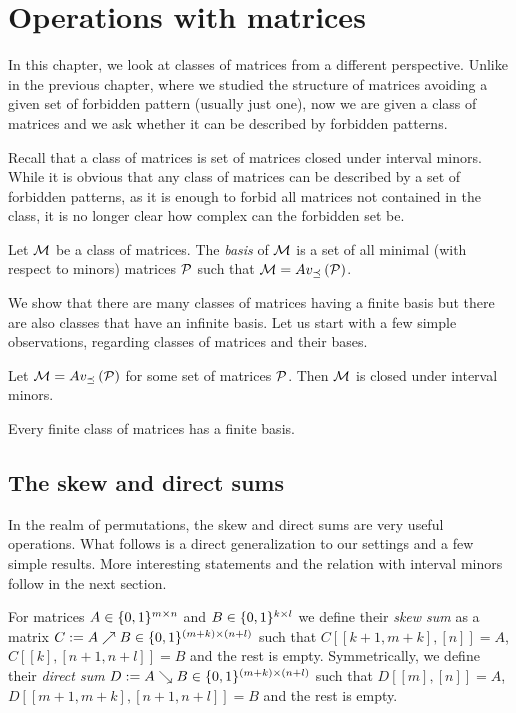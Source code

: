 \chapter{Operations with matrices}
\label{chap:ops}
In this chapter, we look at classes of matrices from a different perspective. Unlike in the previous chapter, where we studied the structure of matrices avoiding a given set of forbidden pattern (usually just one), now we are given a class of matrices and we ask whether it can be described by forbidden patterns.

Recall that a class of matrices is set of matrices closed under interval minors. While it is obvious that any class of matrices can be described by a set of forbidden patterns, as it is enough to forbid all matrices not contained in the class, it is no longer clear how complex can the forbidden set be.

\begin{defn}
Let $\mathcal{M}$ be a class of matrices. The \emph{basis} of $\mathcal{M}$ is a set of all minimal (with respect to minors) matrices $\mathcal{P}$ such that $\mathcal{M}=Av_{\preceq}\left(\mathcal{P}\right)$.
\end{defn}

We show that there are many classes of matrices having a finite basis but there are also classes that have an infinite basis. Let us start with a few simple observations, regarding classes of matrices and their bases. 

\begin{obs}
Let $\mathcal{M}=Av_{\preceq}\left(\mathcal{P}\right)$ for some set of matrices $\mathcal{P}$. Then $\mathcal{M}$ is closed under interval minors.
\end{obs}

\begin{obs}
Every finite class of matrices has a finite basis.
\end{obs}

\section{The skew and direct sums}
In the realm of permutations, the skew and direct sums are very useful operations. What follows is a direct generalization to our settings and a few simple results. More interesting statements and the relation with interval minors follow in the next section.

\begin{defn}
For matrices $A\in\{0,1\}^{m\times n}$ and $B\in\{0,1\}^{k\times l}$ we define their \emph{skew sum} as a matrix $C:=A\nearrow B\in\{0,1\}^{(m+k)\times(n+l)}$ such that $C[[k+1,m+k],[n]]=A$, $C[[k],[n+1,n+l]]=B$ and the rest is empty. Symmetrically, we define their \emph{direct sum} $D:=A\searrow B\in\{0,1\}^{(m+k)\times(n+l)}$ such that $D[[m],[n]]=A$, $D[[m+1,m+k],[n+1,n+l]]=B$ and the rest is empty.
\end{defn}

